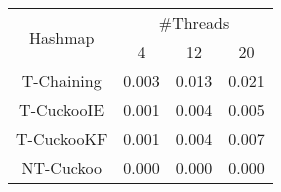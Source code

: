 \begin{tabular}{|c|c|c|c|}
\hline
\multirow{2}{*}{Hashmap} & \multicolumn{3}{c|}{\#Threads}\\\cline{2-4}& 4 & 12 & 20\\
\hline
\hline
T-Chaining & 0.003 & 0.013 & 0.021\\
T-CuckooIE & 0.001 & 0.004 & 0.005\\
T-CuckooKF & 0.001 & 0.004 & 0.007\\
NT-Cuckoo & 0.000 & 0.000 & 0.000\\
\hline
\end{tabular}

